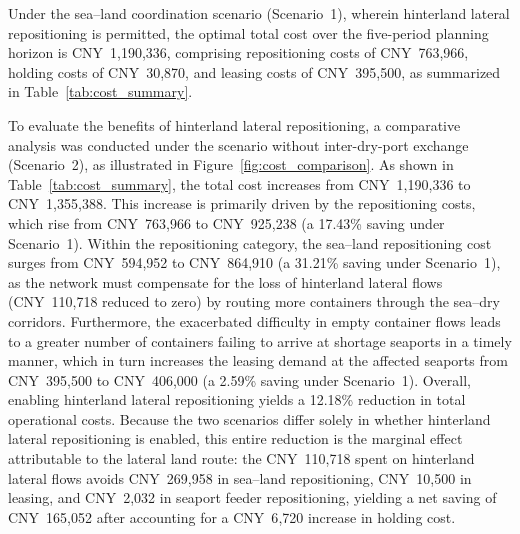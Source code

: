 \documentclass[preprint,12pt]{elsarticle}
\begin{document}
Under the sea–land coordination scenario (Scenario~1), wherein hinterland lateral repositioning is permitted, the optimal total cost over the five-period planning horizon is CNY~1,190,336, comprising repositioning costs of CNY~763,966, holding costs of CNY~30,870, and leasing costs of CNY~395,500, as summarized in Table~\ref{tab:cost_summary}.

To evaluate the benefits of hinterland lateral repositioning, a comparative analysis was conducted under the scenario without inter-dry-port exchange (Scenario~2), as illustrated in Figure~\ref{fig:cost_comparison}. As shown in Table~\ref{tab:cost_summary}, the total cost increases from CNY~1,190,336 to CNY~1,355,388. This increase is primarily driven by the repositioning costs, which rise from CNY~763,966 to CNY~925,238 (a 17.43\% saving under Scenario~1). Within the repositioning category, the sea--land repositioning cost surges from CNY~594,952 to CNY~864,910 (a 31.21\% saving under Scenario~1), as the network must compensate for the loss of hinterland lateral flows (CNY~110,718 reduced to zero) by routing more containers through the sea--dry corridors. Furthermore, the exacerbated difficulty in empty container flows leads to a greater number of containers failing to arrive at shortage seaports in a timely manner, which in turn increases the leasing demand at the affected seaports from CNY~395,500 to CNY~406,000 (a 2.59\% saving under Scenario~1). Overall, enabling hinterland lateral repositioning yields a 12.18\% reduction in total operational costs. Because the two scenarios differ solely in whether hinterland lateral repositioning is enabled, this entire reduction is the marginal effect attributable to the lateral land route: the CNY~110{,}718 spent on hinterland lateral flows avoids CNY~269{,}958 in sea--land repositioning, CNY~10{,}500 in leasing, and CNY~2{,}032 in seaport feeder repositioning, yielding a net saving of CNY~165{,}052 after accounting for a CNY~6{,}720 increase in holding cost.
\end{document}
